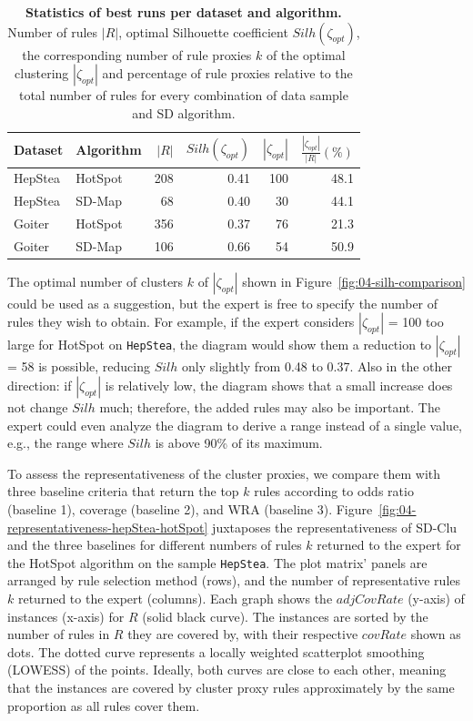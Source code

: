 \documentclass[
  oneside]{book}
\begin{document}
\begin{table}

\caption{\label{tab:04-silh}\textbf{Statistics of best runs per dataset and algorithm.} Number of rules \(|R|\), optimal Silhouette coefficient \(Silh(\zeta_{opt})\), the corresponding number of rule proxies \(k\) of the optimal clustering \(|\zeta_{opt}|\) and percentage of rule proxies relative to the total number of rules for every combination of data sample and SD algorithm.}
\centering
\begin{tabular}[t]{llrrrr}
\toprule
Dataset & Algorithm & $|R|$ & $Silh(\zeta_{opt})$ & $|\zeta_{opt}|$ & $\frac{|\zeta_{opt}|}{|R|} (\%)$\\
\midrule
HepStea & HotSpot & 208 & 0.41 & 100 & 48.1\\
HepStea & SD-Map & 68 & 0.40 & 30 & 44.1\\
Goiter & HotSpot & 356 & 0.37 & 76 & 21.3\\
Goiter & SD-Map & 106 & 0.66 & 54 & 50.9\\
\bottomrule
\end{tabular}
\end{table}

The optimal number of clusters \(k\) of \(|\zeta_{opt}|\) shown in Figure~\ref{fig:04-silh-comparison} could be used as a suggestion, but the expert is free to specify the number of rules they wish to obtain.
For example, if the expert considers \(|\zeta_{opt}|\) = 100 too large for HotSpot on \texttt{HepStea}, the diagram would show them a reduction to \(|\zeta_{opt}|\) = 58 is possible, reducing \(Silh\) only slightly from 0.48 to 0.37.
Also in the other direction: if \(|\zeta_{opt}|\) is relatively low, the diagram shows that a small increase does not change \(Silh\) much; therefore, the added rules may also be important.
The expert could even analyze the diagram to derive a range instead of a single value, e.g., the range where \(Silh\) is above 90\% of its maximum.

To assess the representativeness of the cluster proxies, we compare them with three baseline criteria that return the top \(k\) rules according to odds ratio (baseline 1), coverage (baseline 2), and WRA (baseline 3).
Figure~\ref{fig:04-representativeness-hepStea-hotSpot} juxtaposes the representativeness of SD-Clu and the three baselines for different numbers of rules \(k\) returned to the expert for the HotSpot algorithm on the sample \texttt{HepStea}.
The plot matrix' panels are arranged by rule selection method (rows), and the number of representative rules \(k\) returned to the expert (columns).
Each graph shows the \(adjCovRate\) (y-axis) of instances (x-axis) for \(R\) (solid black curve).
The instances are sorted by the number of rules in \(R\) they are covered by, with their respective \(covRate\) shown as dots.
The dotted curve represents a locally weighted scatterplot smoothing (LOWESS) \autocite{Cleveland:LOWESS1981} of the points.
Ideally, both curves are close to each other, meaning that the instances are covered by cluster proxy rules approximately by the same proportion as all rules cover them.
\end{document}
